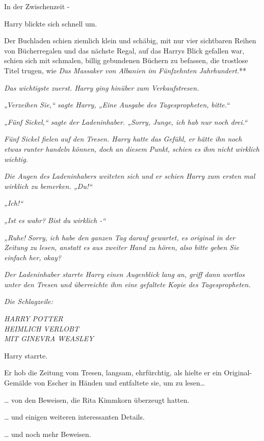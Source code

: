 {In der Zwischenzeit -

Harry blickte sich schnell um.

Der Buchladen schien ziemlich klein und schäbig, mit nur vier sichtbaren Reihen von Bücherregalen und das nächste Regal, auf das Harrys Blick gefallen war, schien sich mit schmalen, billig gebundenen Büchern zu befassen, die trostlose Titel trugen, wie \emph{Das Massaker von Albanien im Fünfzehnten Jahrhundert.}**

\emph{Das wichtigste zuerst. Harry ging hinüber zum Verkaufstresen.}

\emph{„Verzeihen Sie,“ sagte Harry, „Eine Ausgabe des} \emph{\emph{Tagespropheten,}} \emph{bitte.“}

\emph{„Fünf Sickel,“ sagte der Ladeninhaber. „Sorry, Junge, ich hab nur noch drei.“}

\emph{Fünf Sickel fielen auf den Tresen. Harry hatte das Gefühl, er hätte ihn noch etwas} \emph{runter handeln} \emph{können, doch an diesem Punkt, schien es ihm nicht wirklich wichtig.}

\emph{Die Augen des Ladeninhabers weiteten sich und er schien Harry zum ersten mal wirklich zu bemerken. „\emph{Du!}“}

\emph{„\emph{Ich!}“}

\emph{„Ist es} \emph{\emph{wahr?}} \emph{Bist du} \emph{\emph{wirklich -}“}

\emph{„\emph{Ruhe!}} \emph{Sorry, ich habe den} \emph{\emph{ganzen Tag}} \emph{darauf gewartet, es original in der Zeitung zu lesen, anstatt es aus zweiter Hand zu hören, also bitte} \emph{\emph{geben Sie einfach her,}} \emph{okay?}

\emph{Der Ladeninhaber starrte Harry einen Augenblick lang an, griff dann wortlos unter den Tresen und überreichte ihm eine gefaltete Kopie des} \emph{\emph{Tagespropheten.}}

\emph{Die Schlagzeile:}

\emph{HARRY POTTER\\ HEIMLICH VERLOBT\\ MIT GINEVRA WEASLEY}

Harry starrte.

Er hob die Zeitung vom Tresen, langsam, ehrfürchtig, als hielte er ein Original-Gemälde von Escher in Händen und entfaltete sie, um zu lesen…

… von den Beweisen, die Rita Kimmkorn überzeugt hatten.

… und einigen weiteren interessanten Details.

… und noch mehr Beweisen.

}
